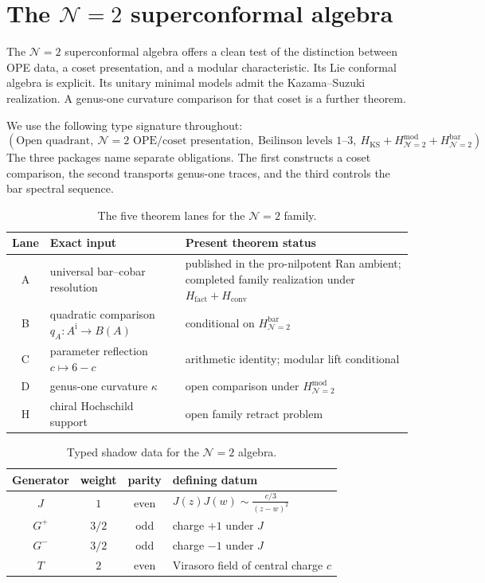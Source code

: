 \chapter{\texorpdfstring{The $\mathcal{N}=2$ superconformal algebra}{The N=2 superconformal algebra}}
\label{chap:n2-sca}

The $\mathcal N=2$ superconformal algebra offers a clean test of the
distinction between OPE data, a coset presentation, and a modular
characteristic.  Its Lie conformal algebra is explicit.  Its unitary
minimal models admit the Kazama--Suzuki realization.  A genus-one
curvature comparison for that coset is a further theorem.

We use the following type signature throughout:
\[
 (\text{Open quadrant},\ \text{$\mathcal N=2$ OPE/coset presentation},\
 \text{Beilinson levels }1\text{--}3,\
 H_{\mathrm{KS}}+H_{\mathcal N=2}^{\mathrm{mod}}
 +H_{\mathcal N=2}^{\mathrm{bar}}).
\]
The three packages name separate obligations.  The first constructs a
coset comparison, the second transports genus-one traces, and the third
controls the bar spectral sequence.

\begin{table}[ht]
\centering
\caption{The five theorem lanes for the $\mathcal N=2$ family.}
\label{tab:n2-five-theorems}
\renewcommand{\arraystretch}{1.2}
\begin{tabular}{@{}c p{5.2cm} p{4.4cm}@{}}
\toprule
Lane & Exact input & Present theorem status \\
\midrule
A & universal bar--cobar resolution & published in the pro-nilpotent
Ran ambient; completed family realization under
$H_{\mathrm{fact}}+H_{\mathrm{conv}}$ \\
B & quadratic comparison $q_A\colon A^{\mathrm i}\to B(A)$ & conditional on $H_{\mathcal N=2}^{\mathrm{bar}}$ \\
C & parameter reflection $c\mapsto6-c$ & arithmetic identity; modular lift conditional \\
D & genus-one curvature $\kappa$ & open comparison under $H_{\mathcal N=2}^{\mathrm{mod}}$ \\
H & chiral Hochschild support & open family retract problem \\
\bottomrule
\end{tabular}
\end{table}

\begin{table}[ht]
\centering
\caption{Typed shadow data for the $\mathcal N=2$ algebra.}
\label{tab:n2-shadow-archetype}
\renewcommand{\arraystretch}{1.2}
\begin{tabular}{@{}c c c p{5.2cm}@{}}
\toprule
Generator & weight & parity & defining datum \\
\midrule
$J$ & $1$ & even & $J(z)J(w)\sim \frac{c/3}{(z-w)^2}$ \\
$G^+$ & $3/2$ & odd & charge $+1$ under $J$ \\
$G^-$ & $3/2$ & odd & charge $-1$ under $J$ \\
$T$ & $2$ & even & Virasoro field of central charge $c$ \\
\bottomrule
\end{tabular}
\end{table}

